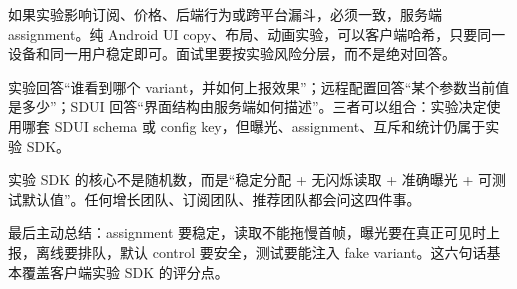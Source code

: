 \begin{followup}[“同一用户多设备必须拿到同一个变体吗？”]
如果实验影响订阅、价格、后端行为或跨平台漏斗，必须一致，服务端 assignment。纯 Android UI copy、布局、动画实验，可以客户端哈希，只要同一设备和同一用户稳定即可。面试里要按实验风险分层，而不是绝对回答。
\end{followup}

\begin{followup}
实验回答“谁看到哪个 variant，并如何上报效果”；远程配置回答“某个参数当前值是多少”；SDUI 回答“界面结构由服务端如何描述”。三者可以组合：实验决定使用哪套 SDUI schema 或 config key，但曝光、assignment、互斥和统计仍属于实验 SDK。
\end{followup}

\begin{idea}[可迁移心法]
实验 SDK 的核心不是随机数，而是“稳定分配 + 无闪烁读取 + 准确曝光 + 可测试默认值”。任何增长团队、订阅团队、推荐团队都会问这四件事。
\end{idea}

\begin{keypoint}[面试收束]
最后主动总结：assignment 要稳定，读取不能拖慢首帧，曝光要在真正可见时上报，离线要排队，默认 control 要安全，测试要能注入 fake variant。这六句话基本覆盖客户端实验 SDK 的评分点。
\end{keypoint}